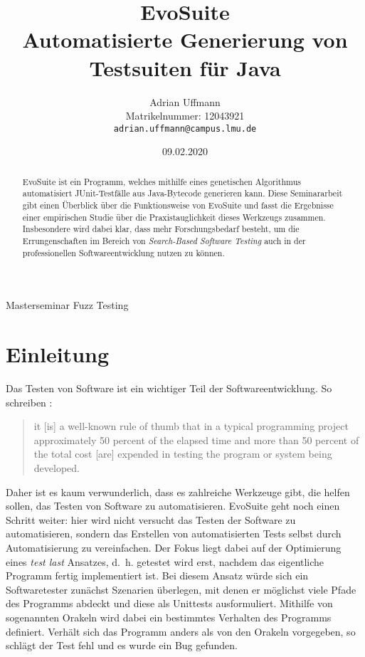 \documentclass[a4paper,11pt]{article}
\title{\textbf{EvoSuite}\\
Automatisierte Generierung von Testsuiten für Java}
\author{Adrian Uffmann\\
Matrikelnummer: 12043921\\
\texttt{adrian.uffmann@campus.lmu.de}}
\date{09.02.2020}
\begin{document}
\maketitle

\begin{center}
Masterseminar Fuzz Testing
\end{center}

\begin{abstract}
EvoSuite ist ein Programm, welches mithilfe eines genetischen Algorithmus automatisiert JUnit-Testfälle aus Java-Bytecode generieren kann.
Diese Seminararbeit gibt einen Überblick über die Funktionsweise von EvoSuite und fasst die Ergebnisse einer empirischen Studie über die Praxistauglichkeit dieses Werkzeugs zusammen.
Insbesondere wird dabei klar, dass mehr Forschungsbedarf besteht, um die Errungenschaften im Bereich von \textit{Search-Based Software Testing} auch in der professionellen Softwareentwicklung nutzen zu können.
\end{abstract}

\section{Einleitung}

Das Testen von Software ist ein wichtiger Teil der Softwareentwicklung.
So schreiben \citet{myers2004art}:
\begin{quote}
it [is] a well-known rule of thumb that in a typical programming project approximately 50 percent of the elapsed time and more than 50 percent of the total cost [are] expended in testing the program or system being developed.
\end{quote}
Daher ist es kaum verwunderlich, dass es zahlreiche Werkzeuge gibt, die helfen sollen, das Testen von Software zu automatisieren.
EvoSuite geht noch einen Schritt weiter: hier wird nicht versucht das Testen der Software zu automatisieren, sondern das Erstellen von automatisierten Tests selbst durch Automatisierung zu vereinfachen.
Der Fokus liegt dabei auf der Optimierung eines \textit{test last} Ansatzes, d.~h. getestet wird erst, nachdem das eigentliche Programm fertig implementiert ist.
Bei diesem Ansatz würde sich ein Softwaretester zunächst Szenarien überlegen, mit denen er möglichst viele Pfade des Programms abdeckt und diese als Unittests ausformuliert.
Mithilfe von sogenannten Orakeln wird dabei ein bestimmtes Verhalten des Programms definiert.
Verhält sich das Programm anders als von den Orakeln vorgegeben, so schlägt der Test fehl und es wurde ein Bug gefunden.
\end{document}
